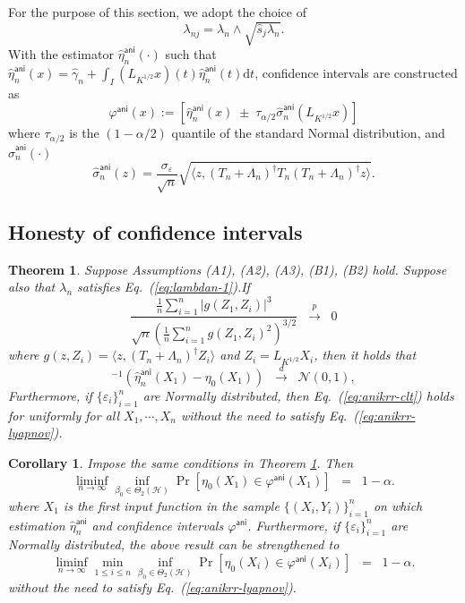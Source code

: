 \documentclass[11pt,a4paper]{article}
\renewcommand{\hat}{\widehat}
\theoremstyle{definition}
\theoremstyle{plain}
\newtheorem{theorem}{Theorem}[section]
\newtheorem{corollary}{Corollary}[section]
\theoremstyle{remark}
\newcommand{\ud}{\mathrm d}
\newcommand{\mH}{\mathcal H}
\newcommand{\ani}{\mathsf{ani}}
\begin{document}
For the purpose of this section, we adopt the choice of 
$$
\lambda_{nj} = \lambda_n\wedge \sqrt{\hat s_j\lambda_n}.
$$
With the estimator $\hat\eta^\ani_n(\cdot)$ such that $\hat\eta^\ani_n(x)=\hat\gamma_n+\int_I (L_{K^{1/2}}x)(t)\hat\eta^\ani_n(t)\ud t$, confidence intervals are constructed as
$$
\varphi^\ani(x) := [\hat\eta^\ani_n(x)\;\pm\;\tau_{\alpha/2}\hat\sigma_n^\ani(L_{K^{1/2}}x)]
$$
where $\tau_{\alpha/2}$ is the $(1-\alpha/2)$ quantile of the standard Normal distribution, and $\hat\sigma_n^\ani(\cdot)$ 
$$
\hat\sigma_n^\ani(z) = \frac{\sigma_\varepsilon}{\sqrt{n}}\sqrt{\langle z, (T_n+\Lambda_n)^{\dagger}T_n(T_n+\Lambda_n)^\dagger z\rangle}.
$$

\subsection{Honesty of confidence intervals}

\begin{theorem}
Suppose Assumptions (A1), (A2), (A3), (B1), (B2) hold. Suppose also that $\lambda_n$ satisfies Eq.~(\ref{eq:lambdan-1}).If 
\begin{equation}
\frac{\frac{1}{n}\sum_{i=1}^n |g(Z_1,Z_i)|^3}{\sqrt{n}(\frac{1}{n}\sum_{i=1}^n g(Z_1,Z_i)^2)^{3/2}}\;\;\overset{p}{\to}\;\; 0
\label{eq:anikrr-lyapnov}
\end{equation}
where $g(z,Z_i)=\langle z,(T_n+\Lambda_n)^{\dagger}Z_i\rangle$ and $Z_i=L_{K^{1/2}}X_i$, then it holds that
\begin{equation}
[\hat\sigma_n^\ani(Z_1)]^{-1}(\hat\eta_n^\ani(X_1)-\eta_0(X_1)) \;\;\overset{d}{\to}\;\;\mathcal N(0,1),
\label{eq:anikrr-clt}
\end{equation}
Furthermore, if $\{\varepsilon_i\}_{i=1}^n$ are Normally distributed, then Eq.~(\ref{eq:anikrr-clt}) holds for \emph{uniformly} for all $X_1,\cdots,X_n$ without the need to satisfy Eq.~(\ref{eq:anikrr-lyapnov}).
\label{thm:anikrr-limiting}
\end{theorem}

\begin{corollary}
Impose the same conditions in Theorem \ref{thm:anikrr-limiting}. Then 
$$
\liminf_{n\to\infty}\inf_{\beta_0\in\Theta_2(\mH)}\Pr[\eta_0(X_1)\in\varphi^\ani(X_1)] \;\; = \;\; 1-\alpha.
$$
where $X_1$ is the first input function in the sample $\{(X_i,Y_i)\}_{i=1}^n$ on which estimation $\hat\eta_n^{\ani}$ and confidence intervals $\varphi^\ani$.
Furthermore, if $\{\varepsilon_i\}_{i=1}^n$ are Normally distributed, the above result can be strengthened to
$$
\liminf_{n\to\infty}\min_{1\leq i\leq n}\inf_{\beta_0\in\Theta_2(\mH)}\Pr[\eta_0(X_i)\in\varphi^\ani(X_i)] \;\; = \;\; 1-\alpha.
$$
without the need to satisfy Eq.~(\ref{eq:anikrr-lyapnov}).
\label{cor:anikrr-ci}
\end{corollary}
\end{document}
